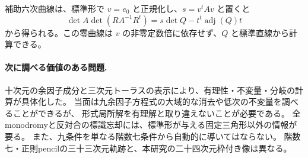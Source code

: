 補助六次曲線は、標準形で $v=e_0$ と正規化し、$s=v^tAv$ と置くと
\[
 \det A\det(RA^{-1}R^t)
 =s\det Q-t^t\operatorname{adj}(Q)t
\]
から得られる。この零曲線は $v$ の非零定数倍に依存せず、$Q$ と標準直線から計算できる。

\paragraph{次に調べる価値のある問題.}
十次元の余因子成分と三次元トーラスの表示により、有理性・不変量・分岐の計算が具体化した。
当面は九余因子方程式の大域的な消去や低次の不変量を調べることができるが、
形式局所解を有理解と取り違えないことが必要である。
全monodromyと反対合の標識忘却には、標準形が与える固定三角形以外の情報が要る。
また、九条件を単なる階数七条件から自動的に導いてはならない。
階数七・正則pencilの三十三次元軌跡と、本研究の二十四次元枠付き像は異なる。
